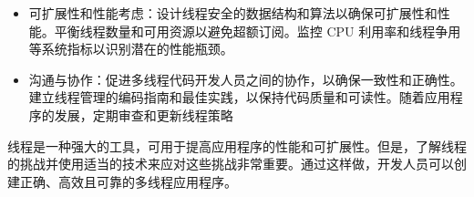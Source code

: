\begin{itemize}
\item
可扩展性和性能考虑：设计线程安全的数据结构和算法以确保可扩展性和性能。平衡线程数量和可用资源以避免超额订阅。监控 CPU 利用率和线程争用等系统指标以识别潜在的性能瓶颈。

\item
沟通与协作：促进多线程代码开发人员之间的协作，以确保一致性和正确性。建立线程管理的编码指南和最佳实践，以保持代码质量和可读性。随着应用程序的发展，定期审查和更新线程策略
\end{itemize}

线程是一种强大的工具，可用于提高应用程序的性能和可扩展性。但是，了解线程的挑战并使用适当的技术来应对这些挑战非常重要。通过这样做，开发人员可以创建正确、高效且可靠的多线程应用程序。


















